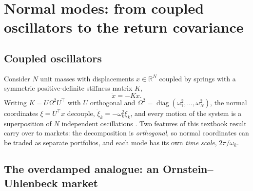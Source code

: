\section{Normal modes: from coupled oscillators to the return covariance}
\label{sec:theory}

\subsection{Coupled oscillators}

Consider $N$ unit masses with displacements $x\in\mathbb{R}^N$ coupled by
springs with a symmetric positive-definite stiffness matrix $K$,
\begin{equation}
  \ddot{x} = -Kx .
  \label{eq:oscillator}
\end{equation}
Writing $K = U\Omega^2U^\top$ with $U$ orthogonal and
$\Omega^2 = \operatorname{diag}(\omega_1^2,\dots,\omega_N^2)$, the normal
coordinates $\xi = U^\top x$ decouple, $\ddot\xi_k = -\omega_k^2\xi_k$,
and every motion of the system is a superposition of $N$ independent
oscillations \citep{goldstein2002}. Two features of this textbook result
carry over to markets: the decomposition is \emph{orthogonal}, so
normal coordinates can be traded as separate portfolios, and each mode
has its own \emph{time scale}, $2\pi/\omega_k$.

\subsection{The overdamped analogue: an Ornstein--Uhlenbeck market}

